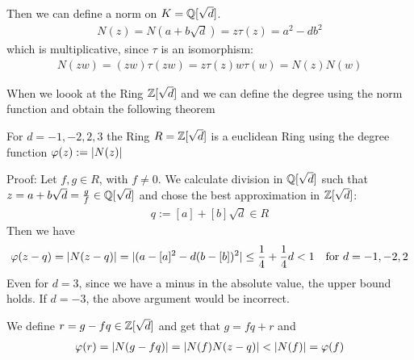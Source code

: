 Then we can define a norm on $K=\mathbb{Q}[\sqrt{d}]$. 
\begin{align*}
	N(z) = N(a + b \sqrt{d}) = z \tau(z) = a^2 - db^2
\end{align*}
which is multiplicative, since $\tau$ is an isomorphism:
\begin{align*}
	N(zw) = (zw) \tau(zw) = z \tau(z) w \tau(w) = N(z) N(w)
\end{align*}

When we loook at the Ring $\mathbb{Z}[\sqrt{d}]$ and we can define the degree using the norm function and obtain the following theorem

\begin{theorem}[]
	For $d = -1, -2, 2, 3$ the Ring $R = \mathbb{Z}[\sqrt{d}]$ is a euclidean Ring using the degree function $\varphi(z) := \vert N(z)\vert$
\end{theorem}

Proof: Let $f,g \in R$, with $f \neq 0$. We calculate division in $\mathbb{Q}[\sqrt{d}]$ such that $z = a + b \sqrt{d} = \frac{g}{f} \in \mathbb{Q}[\sqrt{d}]$ and chose the best approximation in $\mathbb{Z}[\sqrt{d}]$:
\begin{align*}
	q:= [a] + [b] \sqrt{d} \in R
\end{align*}
Then we have
\begin{align*}
	\varphi(z-q) = \vert N(z-q)\vert = \vert(a - [a]^2 - d(b- [b])^2\vert \leq \frac{1}{4} + \frac{1}{4}d < 1\quad \text{for } d = -1,-2,2
\end{align*}
Even for $d = 3$, since we have a minus in the absolute value, the upper bound holds. If $d = -3$, the above argument would be incorrect.

We define $r = g - fq \in \mathbb{Z}[\sqrt{d}]$ and get that $g = fq + r$ and
\begin{align*}
	\varphi(r) = \vert N(g - fq)\vert = \vert N(f)N(z-q)\vert < \vert N(f)\vert = \varphi(f)
\end{align*}

